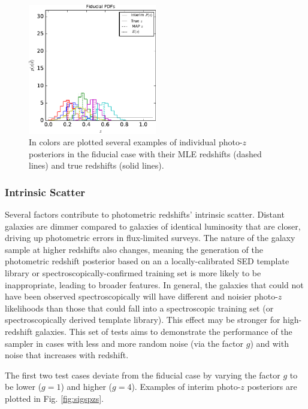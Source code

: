 \documentclass[preprint]{aastex}
\begin{document}
\begin{figure}
\includegraphics[width=0.5\textwidth]{figs/sig2/samplepzs.pdf}
\caption{In colors are plotted several examples of individual photo-$z$ 
posteriors in the fiducial case with their MLE redshifts (dashed lines) and 
true redshifts (solid lines).}
\label{fig:nullpzs}
\end{figure}

\subsubsection{Intrinsic Scatter}
\label{sec:imprecision}

Several factors contribute to photometric redshifts' intrinsic scatter.  
Distant galaxies are dimmer compared to galaxies of identical luminosity that 
are closer, driving up photometric errors in flux-limited surveys.  The nature 
of the galaxy sample at higher redshifts also changes, meaning the generation 
of the photometric redshift posterior based on an a locally-calibrated SED 
template library or spectroscopically-confirmed training set is more likely to 
be inappropriate, leading to broader features.  In general, the galaxies that 
could not have been observed spectroscopically will have different and noisier 
photo-$z$ likelihoods than those that could fall into a spectroscopic training 
set (or spectroscopically derived template library).  This effect may be 
stronger for high-redshift galaxies.  This set of tests aims to demonstrate the 
performance of the sampler in cases with less and more random noise (via the 
factor $g$) and with noise that increases with redshift.

The first two test cases deviate from the fiducial case by varying the factor 
$g$ to be lower ($g=1$) and higher ($g=4$).  Examples of interim photo-$z$ 
posteriors are plotted in Fig. \ref{fig:sigspzs}.
\end{document}
